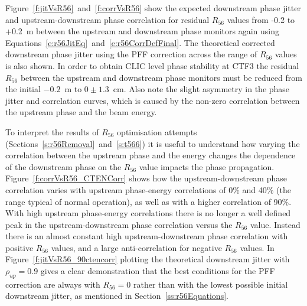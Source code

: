 Figure~\ref{f:jitVsR56}~and~\ref{f:corrVsR56} show the expected downstream phase jitter and upstream-downstream phase correlation for residual \(R_{56}\) values from -0.2 to +0.2~m between the upstream and downstream phase monitors again using Equations~\ref{e:r56JitEq}~and~\ref{e:r56CorrDefFinal}. The theoretical corrected downstream phase jitter using the PFF correction across the range of \(R_{56}\) values is also shown. In order to obtain CLIC level phase stability at CTF3 the residual \(R_{56}\) between the upstream and downstream phase monitors must be reduced from the initial \(-0.2\)~m to \(0\pm1.3\)~cm. Also note the slight asymmetry in the phase jitter and correlation curves, which is caused by the non-zero correlation between the upstream phase and the beam energy. 


To interpret the results of \(R_{56}\) optimisation attempts (Sections~\ref{s:r56Removal}~and~\ref{s:t566}) it is useful to understand how varying the correlation between the upstream phase and the energy changes the dependence of the downstream phase on the \(R_{56}\) value impacts the phase propagation. 
Figure~\ref{f:corrVsR56_CTENCorr} shows how the upstream-downstream phase correlation varies with upstream phase-energy correlations of 0\% and 40\% (the range typical of normal operation), as well as with a higher correlation of 90\%. With high upstream phase-energy correlations there is no longer a well defined peak in the upstream-downstream phase correlation versus the \(R_{56}\) value. Instead there is an almost constant high upstream-downstream phase correlation with positive \(R_{56}\) values, and a large anti-correlation for negative \(R_{56}\) values. %
In Figure~\ref{f:jitVsR56_90ctencorr} plotting the theoretical downstream jitter with \(\rho_{up} = 0.9\) gives a clear demonstration that the best conditions for the PFF correction are always with \(R_{56} = 0\) rather than with the lowest possible initial downstream jitter, as mentioned in Section~\ref{ss:r56Equations}. %

